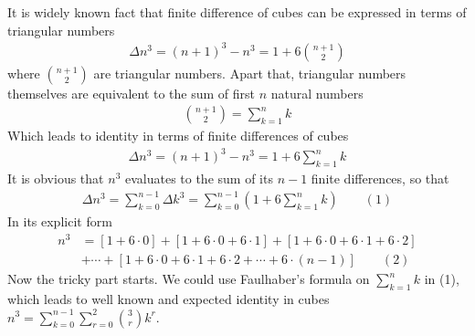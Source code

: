 It is widely known fact that finite difference of cubes can be expressed in terms of triangular numbers
\begin{align*}
    \Delta n^3 = (n+1)^3 - n^3 = 1 + 6 \binom{n+1}{2}
\end{align*}
where $\binom{n+1}{2}$ are triangular numbers.
Apart that, triangular numbers themselves are equivalent to the sum of first $n$ natural numbers
\begin{align*}
    \binom{n+1}{2} = \sum_{k=1}^{n} k
\end{align*}
Which leads to identity in terms of finite differences of cubes
\begin{align*}
    \Delta n^3 = (n+1)^3 - n^3 = 1 + 6 \sum_{k=1}^{n} k
\end{align*}
It is obvious that $n^3$ evaluates to the sum of its $n-1$ finite differences, so that
\begin{align*}
    \Delta n^3 = \sum_{k=0}^{n-1} \Delta k^3 = \sum_{k=0}^{n-1} \left( 1 + 6 \sum_{k=1}^{n} k \right)
    \quad \quad (1)
\end{align*}
In its explicit form
\begin{align*}
    n^3 &= [1+6\cdot0]+[1+6\cdot0+6\cdot1]+[1+6\cdot0+6\cdot1+6\cdot2]  \\
    &+ \cdots + [1+6\cdot0+6\cdot1+6\cdot2+\cdots+6\cdot(n-1)] \quad \quad (2)
\end{align*}
Now the tricky part starts.
We could use Faulhaber's formula on $\sum_{k=1}^{n} k$ in (1),
which leads to well known and expected identity in cubes $n^3 = \sum_{k=0}^{n-1} \sum_{r=0}^{2} \binom{3}{r} k^r$.

